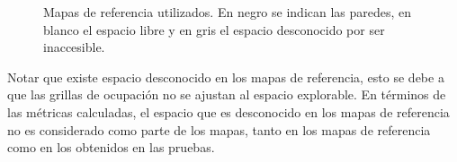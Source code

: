 \begin{figure}[H]
  \centerfloat

  \qquad
  \qquad
  \qquad

  \caption[Mapas de referencia utilizados.]{Mapas de referencia utilizados. En negro se indican las paredes, en blanco el espacio libre y en gris el espacio desconocido por ser inaccesible.}\label{fig:mref}

\end{figure}

Notar que existe espacio desconocido en los mapas de referencia, esto se debe a
que las grillas de ocupación no se ajustan al espacio explorable. En términos de
las métricas calculadas, el espacio que es desconocido en los mapas de
referencia no es considerado como parte de los mapas, tanto en los mapas de
referencia como en los obtenidos en las pruebas.

